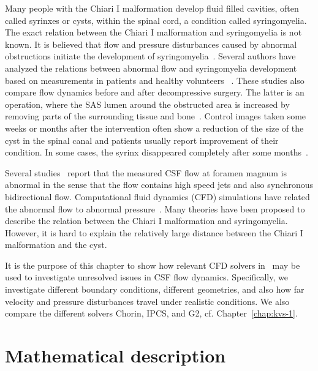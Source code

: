 Many people with the Chiari I malformation develop fluid filled
cavities, often called syrinxes or cysts, within the spinal
cord,  a condition called syringomyelia. The exact
relation between the Chiari I malformation and syringomyelia is not
known. It is believed that flow and pressure disturbances caused by
abnormal obstructions initiate the development of
syringomyelia~\citep{OldfieldMuraszkoShawkerEtAl1994}. Several authors
have analyzed the relations between abnormal flow and syringomyelia
development based on measurements in patients and healthy volunteers
~\citep{HeissPatronasDeVroomEtAl1999,PinnaAlessandriniAlfieriEtAl2000,HofmannWarmuth-MetzBendszusEtAl2000,HaughtonKorosecMedowEtAl2003}. These
studies also compare flow dynamics before and after decompressive
surgery. The latter is an operation, where the SAS lumen around the
obstructed area is increased by removing parts of the surrounding
tissue and bone~\citep{MilhoratBolognese2003}. Control images taken
some weeks or months after the intervention often show a reduction of
the size of the cyst in the spinal canal and patients usually report
improvement of their condition. In some cases, the syrinx disappeared
completely after some
months~\citep{OldfieldMuraszkoShawkerEtAl1994,PinnaAlessandriniAlfieriEtAl2000,HeissPatronasDeVroomEtAl1999}.

Several studies~\citep{Quigley2004,HaughtonKorosecMedowEtAl2003}
report that the measured CSF flow at foramen magnum is abnormal in the
sense that the flow contains high speed jets and also synchronous
bidirectional flow.  Computational fluid dynamics (CFD) simulations
have related the abnormal flow to abnormal
pressure~\citep{RoldanHaughtonWiebenEtAl2009,HentschelMardalLovgren2010,LingeHaughtonLovgren2010,LingeHaughtonLovgren2011}.
Many theories have been proposed to describe the relation between the
Chiari I malformation and syringomyelia. However, it is hard to
explain the relatively large distance between the Chiari I
malformation and the cyst.

It is the purpose of this chapter to show how relevant CFD solvers
in \fenics\ may be used to investigate unresolved issues in CSF flow
dynamics.  Specifically, we investigate different boundary conditions,
different geometries, and also how far velocity and pressure
disturbances travel under realistic conditions. We also compare the
different solvers Chorin, IPCS, and G2, cf. Chapter~\ref{chap:kvs-1}.

\section{Mathematical description}


